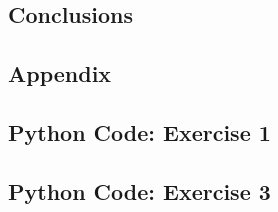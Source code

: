 \documentclass[letterpaper,12pt]{article}
\begin{document}
\subsection{Conclusions}

\pagebreak

\begin{center}
  \section*{Appendix}
\end{center}

\subsection*{Python Code: Exercise 1}



\pagebreak

\subsection*{Python Code: Exercise 3}



\pagebreak

\begin{thebibliography}{99}


\end{thebibliography}
\end{document}
